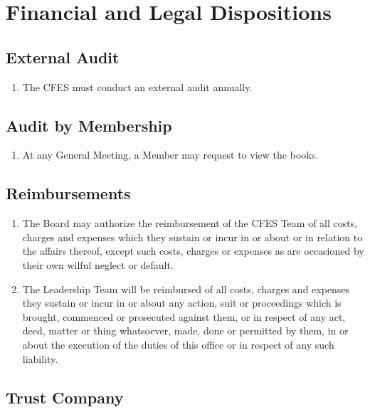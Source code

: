 \section{Financial and Legal Dispositions}
\label{financial-and-legal-dispositions}

\subsection{External Audit}
\label{financial-and-legal-dispositions-external-audit}

\begin{enumerate}
 \item The CFES must conduct an external audit annually.
\end{enumerate}

\subsection{Audit by Membership}
\label{financial-and-legal-dispositions-audit-by-membership}

\begin{enumerate}
 \item At any General Meeting, a Member may request to view the books.
\end{enumerate}

\subsection{Reimbursements}
\label{financial-and-legal-dispositions-reimbursements}

\begin{enumerate}
 \item The Board may authorize the reimbursement of the CFES Team of all costs, charges and expenses which they sustain or incur in or about or in relation to the affairs thereof, except such costs, charges or expenses as are occasioned by their own wilful neglect or default.
 \item The Leadership Team will be reimbursed of all costs, charges and expenses they sustain or incur in or about any action, suit or proceedings which is brought, commenced or prosecuted against them, or in respect of any act, deed, matter or thing whatsoever, made, done or permitted by them, in or about the execution of the duties of this office or in respect of any such liability.
\end{enumerate}

\subsection{Trust Company}
\label{financial-and-legal-dispositions-trust-company}

